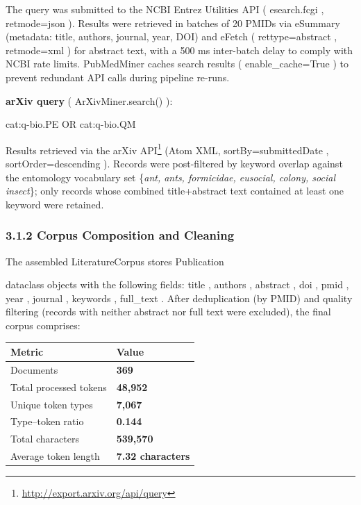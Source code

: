 \documentclass[
]{article}
\newenvironment{Shaded}{}{}
\newcommand{\NormalTok}[1]{#1}
\newcounter{none} %
\numberwithin{equation}{section}
\renewcommand{\texttt}[1]{%
    \colorbox{codebg}{\color{codefg}\ttfamily #1}%
}
\DeclareRobustCommand{\href}[2]{#2\footnote{\url{#1}}}
\begin{document}
The query was submitted to the NCBI Entrez Utilities API
(\texttt{esearch.fcgi}, \texttt{retmode=json}). Results were retrieved
in batches of 20 PMIDs via \texttt{eSummary} (metadata: title, authors,
journal, year, DOI) and \texttt{eFetch} (\texttt{rettype=abstract},
\texttt{retmode=xml}) for abstract text, with a 500 ms inter-batch delay
to comply with NCBI rate limits. \texttt{PubMedMiner} caches search
results (\texttt{enable\_cache=True}) to prevent redundant API calls
during pipeline re-runs.

\textbf{arXiv query} (\texttt{ArXivMiner.search()}):

\begin{Shaded}
\begin{Highlighting}[]
\NormalTok{cat:q{-}bio.PE OR cat:q{-}bio.QM}
\end{Highlighting}
\end{Shaded}

Results retrieved via the \href{http://export.arxiv.org/api/query}{arXiv
API} (Atom XML, \texttt{sortBy=submittedDate},
\texttt{sortOrder=descending}). Records were post-filtered by keyword
overlap against the entomology vocabulary set \{\emph{ant, ants,
formicidae, eusocial, colony, social insect}\}; only records whose
combined title+abstract text contained at least one keyword were
retained.

\subsubsection{3.1.2 Corpus Composition and
Cleaning}\label{corpus-composition-and-cleaning}

The assembled \texttt{LiteratureCorpus} stores \texttt{Publication}
dataclass objects with the following fields: \texttt{title},
\texttt{authors}, \texttt{abstract}, \texttt{doi}, \texttt{pmid},
\texttt{year}, \texttt{journal}, \texttt{keywords}, \texttt{full\_text}.
After deduplication (by PMID) and quality filtering (records with
neither abstract nor full text were excluded), the final corpus
comprises:

{\def\LTcaptype{none} %
\begin{longtable}[]{@{}ll@{}}
\toprule\noalign{}
Metric & Value \\
\midrule\noalign{}
\endhead
\bottomrule\noalign{}
\endlastfoot
Documents & \textbf{369} \\
Total processed tokens & \textbf{48,952} \\
Unique token types & \textbf{7,067} \\
Type--token ratio & \textbf{0.144} \\
Total characters & \textbf{539,570} \\
Average token length & \textbf{7.32 characters} \\
\end{longtable}
}
\end{document}
